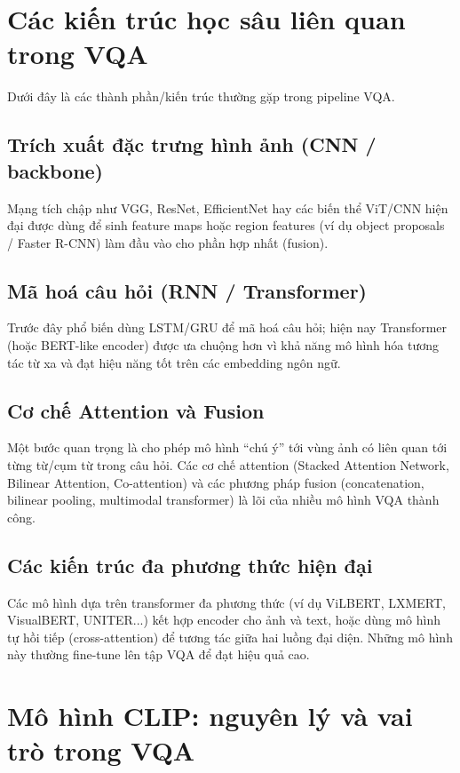 \section{Các kiến trúc học sâu liên quan trong VQA}
Dưới đây là các thành phần/kiến trúc thường gặp trong pipeline VQA.

\subsection{Trích xuất đặc trưng hình ảnh (CNN / backbone)}
Mạng tích chập như VGG, ResNet, EfficientNet hay các biến thể ViT/CNN hiện đại được dùng để sinh feature maps hoặc region features (ví dụ object proposals / Faster R-CNN) làm đầu vào cho phần hợp nhất (fusion).\\

\subsection{Mã hoá câu hỏi (RNN / Transformer)}
Trước đây phổ biến dùng LSTM/GRU để mã hoá câu hỏi; hiện nay Transformer (hoặc BERT-like encoder) được ưa chuộng hơn vì khả năng mô hình hóa tương tác từ xa và đạt hiệu năng tốt trên các embedding ngôn ngữ.\\

\subsection{Cơ chế Attention và Fusion}
Một bước quan trọng là cho phép mô hình “chú ý” tới vùng ảnh có liên quan tới từng từ/cụm từ trong câu hỏi. Các cơ chế attention (Stacked Attention Network, Bilinear Attention, Co-attention) và các phương pháp fusion (concatenation, bilinear pooling, multimodal transformer) là lõi của nhiều mô hình VQA thành công.

\subsection{Các kiến trúc đa phương thức hiện đại}
Các mô hình dựa trên transformer đa phương thức (ví dụ ViLBERT, LXMERT, VisualBERT, UNITER...) kết hợp encoder cho ảnh và text, hoặc dùng mô hình tự hồi tiếp (cross-attention) để tương tác giữa hai luồng đại diện. Những mô hình này thường fine-tune lên tập VQA để đạt hiệu quả cao.

\section{Mô hình CLIP: nguyên lý và vai trò trong VQA}
